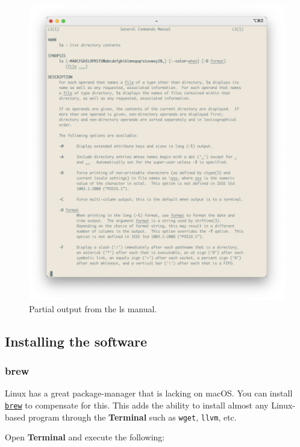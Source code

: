 \documentclass[
]{book}
\newcommand{\passthrough}[1]{#1}
\begin{document}
\begin{figure}[H]

{\centering \includegraphics[width=0.85\linewidth]{img/ls_manual} 

}

\caption{Partial output from the ls manual.}\label{fig:lsmanual}
\end{figure}

\hypertarget{installing-the-software}{%
\subsection{Installing the software}\label{installing-the-software}}

\hypertarget{brew}{%
\subsubsection{brew}\label{brew}}

Linux has a great package-manager that is lacking on macOS. You can install \href{https://brew.sh}{\passthrough{\lstinline!brew!}} to compensate for this. This adds the ability to install almost any Linux-based program through the \textbf{Terminal} such as \passthrough{\lstinline!wget!}, \passthrough{\lstinline!llvm!}, etc.

Open \textbf{Terminal} and execute the following:
\end{document}
